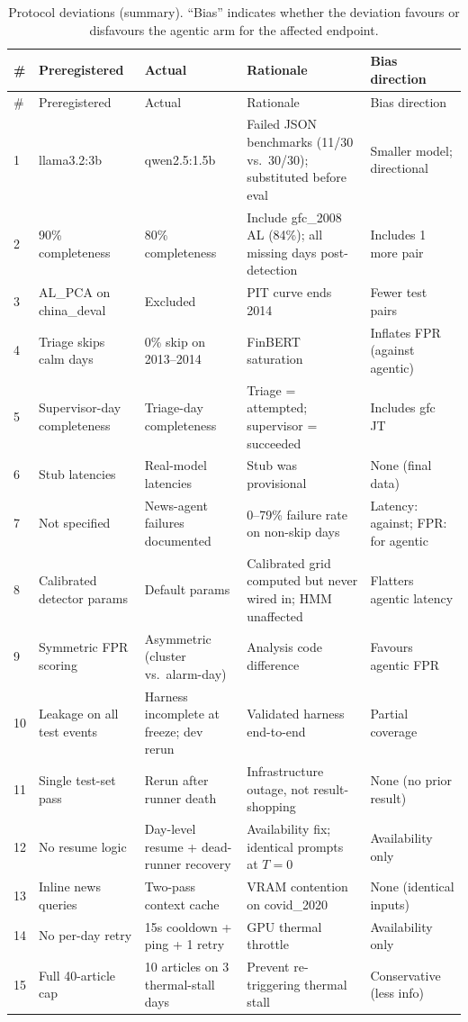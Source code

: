 \documentclass[11pt,a4paper]{article}
\begin{document}
\begin{longtable}{@{}p{0.6cm} p{3.2cm} p{3.2cm} p{3.2cm} p{2.5cm}@{}}
\caption{Protocol deviations (summary). ``Bias'' indicates whether the
deviation favours or disfavours the agentic arm for the affected
endpoint.}\label{tab:deviations} \\
\toprule
\# & Preregistered & Actual & Rationale & Bias direction \\
\midrule
\endfirsthead
\toprule
\# & Preregistered & Actual & Rationale & Bias direction \\
\midrule
\endhead
1 & llama3.2:3b & qwen2.5:1.5b & Failed JSON benchmarks (11/30 vs.\ 30/30);
    substituted before eval & Smaller model; directional \\
2 & 90\% completeness & 80\% completeness & Include gfc\_2008 AL (84\%); all
    missing days post-detection & Includes 1 more pair \\
3 & AL\_PCA on china\_deval & Excluded & PIT curve ends 2014 & Fewer test pairs \\
4 & Triage skips calm days & 0\% skip on 2013--2014 & FinBERT saturation & Inflates
    FPR (against agentic) \\
5 & Supervisor-day completeness & Triage-day completeness & Triage = attempted;
    supervisor = succeeded & Includes gfc JT \\
6 & Stub latencies & Real-model latencies & Stub was provisional & None (final
    data) \\
7 & Not specified & News-agent failures documented & 0--79\% failure rate on
    non-skip days & Latency: against; FPR: for agentic \\
8 & Calibrated detector params & Default params & Calibrated grid computed but
    never wired in; HMM unaffected & Flatters agentic latency \\
9 & Symmetric FPR scoring & Asymmetric (cluster vs.\ alarm-day) & Analysis
    code difference & Favours agentic FPR \\
10 & Leakage on all test events & Harness incomplete at freeze; dev rerun &
     Validated harness end-to-end & Partial coverage \\
11 & Single test-set pass & Rerun after runner death & Infrastructure outage,
     not result-shopping & None (no prior result) \\
12 & No resume logic & Day-level resume + dead-runner recovery & Availability
     fix; identical prompts at $T\!=\!0$ & Availability only \\
13 & Inline news queries & Two-pass context cache & VRAM contention on
     covid\_2020 & None (identical inputs) \\
14 & No per-day retry & 15s cooldown + ping + 1 retry & GPU thermal throttle &
     Availability only \\
15 & Full 40-article cap & 10 articles on 3 thermal-stall days & Prevent
     re-triggering thermal stall & Conservative (less info) \\
\bottomrule
\end{longtable}
\end{document}

